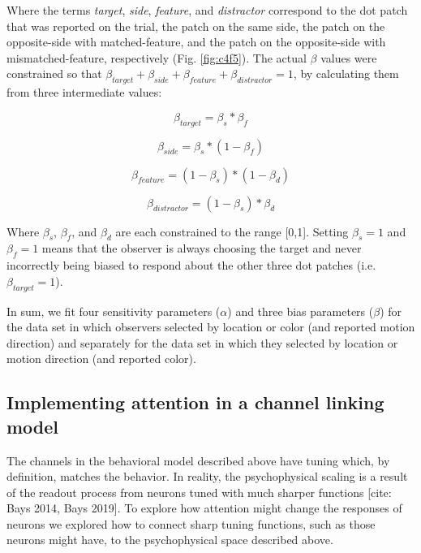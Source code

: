 Where the terms \textit{target}, \textit{side}, \textit{feature}, and \textit{distractor} correspond to the dot patch that was reported on the trial, the patch on the same side, the patch on the opposite-side with matched-feature, and the patch on the opposite-side with mismatched-feature, respectively (Fig. \ref{fig:c4f5}). The actual $\beta$ values were constrained so that $\beta_{target}+\beta_{side}+\beta_{feature}+\beta_{distractor}=1$, by calculating them from three intermediate values:

\begin{equation}
    \beta_{target} = \beta_{s} * \beta_{f}
\end{equation}

\begin{equation}
    \beta_{side} = \beta_{s} * (1-\beta_{f})
\end{equation}

\begin{equation}
    \beta_{feature} = (1-\beta_{s}) * (1-\beta_{d})
\end{equation}

\begin{equation}
    \beta_{distractor} = (1-\beta_{s}) * \beta_{d}
\end{equation}

Where $\beta_s$, $\beta_f$, and $\beta_d$ are each constrained to the range [0,1]. Setting $\beta_s=1$ and $\beta_f=1$ means that the observer is always choosing the target and never incorrectly being biased to respond about the other three dot patches (i.e. $\beta_{target}=1$).

In sum, we fit four sensitivity parameters ($\alpha$) and three bias parameters ($\beta$) for the data set in which observers selected by location or color (and reported motion direction) and separately for the data set in which they selected by location or motion direction (and reported color).

\subsection{Implementing attention in a channel linking model}

The channels in the behavioral model described above have tuning which, by definition, matches the behavior. In reality, the psychophysical scaling is a result of the readout process from neurons tuned with much sharper functions [cite: Bays 2014, Bays 2019]. To explore how attention might change the responses of neurons we explored how to connect sharp tuning functions, such as those neurons might have, to the psychophysical space described above.

